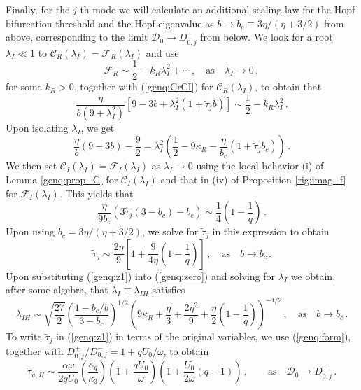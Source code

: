 \documentclass{article}%
\begin{document}
Finally, for the $j$-th mode we will calculate an additional scaling
law for the Hopf bifurcation threshold and the Hopf eigenvalue as
$b\to b_c\equiv {3\eta/(\eta+{3/2})}$ from above, corresponding to the
limit ${\mathcal D}_0\to D^{+}_{0,j}$ from below. We look for a root
$\lambda_I\ll 1$ to ${\mathcal C}_R(\lambda_I)={\mathcal
  F}_R(\lambda_I)$ and use
\begin{equation}\label{genq:kr}
    {\mathcal F}_{R}\sim \frac{1}{2} - k_R \lambda_I^2 + \cdots \,, \quad
\mbox{as} \quad \lambda_I \to 0 \,,
\end{equation}
for some $k_R>0$, together with (\ref{genq:CrCI}) for ${\mathcal
  C}_R(\lambda_I)$, to obtain that
\begin{equation*}
     \frac{\eta}{b(9+\lambda_I^2)} \left[ 9 -3b + \lambda_I^2
   (1+\tilde{\tau}_j b) \right] \sim \frac{1}{2} - k_R \lambda_I^2 \,.
\end{equation*}
Upon isolating $\lambda_I$, we get
\begin{equation}\label{genq:zero}
     \frac{\eta}{b}(9-3b) - \frac{9}{2} = \lambda_I^2 \left( \frac{1}{2}
   - 9\kappa_R - \frac{\eta}{b_c} \left(1+\tilde{\tau}_j b_c\right)\right)\,.
\end{equation}
We then set ${\mathcal C}_I(\lambda_I)={\mathcal F}_I(\lambda_I)$ as 
$\lambda_I\to 0$ using the local behavior (i) of Lemma
\ref{genq:prop_C} for ${\mathcal C}_I(\lambda_I)$ and that in
(iv) of Proposition \ref{rig:imag_f} for ${\mathcal F}_{I}(\lambda_I)$.
This yields that
\begin{equation*}
   \frac{\eta}{9b_c} \left( 3\tilde{\tau}_j (3-b_c) - b_c\right) \sim
  \frac{1}{4}\left( 1 - \frac{1}{q}\right) \,.
\end{equation*}
Upon using $b_c={3\eta/(\eta+{3/2})}$, we solve for $\tilde{\tau}_j$
in this expression to obtain
\begin{equation}\label{genq:z1}
   \tilde{\tau}_j \sim \frac{2\eta}{9} \left[ 1 + \frac{9}{4\eta}
  \left( 1 - \frac{1}{q} \right) \right]\,, \quad \mbox{as} \quad 
b \to b_c \,.
\end{equation}
Upon substituting (\ref{genq:z1}) into (\ref{genq:zero}) and solving
for $\lambda_I$ we obtain, after some algebra, that $\lambda_I\equiv
\lambda_{IH}$ satisfies
\begin{equation}\label{genq:z1_lam}
\lambda_{IH} \sim \sqrt{\frac{27}{2}} \left( \frac{1-{b_c/b}}{3-b_c}\right)^{1/2}
  \left( 9\kappa_R + \frac{\eta}{3} + \frac{2\eta^2}{9} + \frac{\eta}{2}
  \left(1- \frac{1}{q}\right) \right)^{-1/2} \,, \quad \mbox{as} \quad
 b \to b_c \,.
\end{equation}
To write $\tilde{\tau}_j$ in (\ref{genq:z1}) in terms of the original
variables, we use (\ref{genq:form}), together with
${D^{+}_{0,j}/D^{-}_{0,j}}=1+{qU_0/\omega}$, to obtain
\begin{equation}\label{genq:final_lim}
   \hat{\tau}_{u,H}\sim \frac{\alpha\omega}{2q U_0} 
  \left( \frac{\kappa_q}{\kappa_3} \right) \left( 1 + \frac{q U_0}{\omega} 
 \right) \left( 1 + \frac{U_0}{2\omega}(q-1)\right) \,, \qquad
 \mbox{as} \quad {\mathcal D}_0 \to D^{+}_{0,j} \,.
\end{equation}
\end{document}
